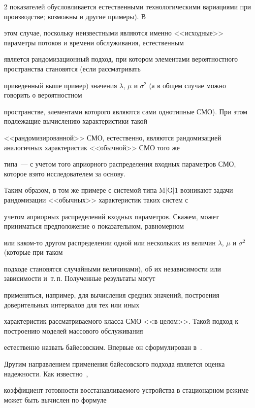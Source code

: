 \begin{multicols}{2}
показателей обусловливается естественными технологическими вариациями при производстве; возможны и другие примеры). В


этом случае, поскольку неизвестными являются именно <<исходные>> параметры потоков и времени обслуживания, естественным


является рандомизационный подход, при котором элементами вероятностного пространства становятся (если рассматривать


приведенный выше пример) значения $\lambda$, $\mu$ и $\sigma^2$ (а в общем случае можно говорить о вероятностном


пространстве, элементами которого являются сами однотипные СМО). При этом подлежащие вычислению характеристики такой


<<рандомизированной>> СМО, естественно, являются рандомизацией аналогичных характеристик <<обычной>> СМО того же


типа~--- с учетом того априорного распределения входных параметров СМО, которое взято исследователем за основу.





Таким образом, в том же примере с системой типа M$\vert$G$\vert$1 возникают задачи рандомизации <<обычных>> характеристик таких систем с


учетом априорных распределений входных па\-ра\-мет\-ров. Скажем, может приниматься предположение о показательном, равномерном


или каком-то другом распределении одной или нескольких из величин $\lambda$, $\mu$ и $\sigma^2$ (которые при таком


подходе становятся случайными величинами), об их независимости или зависимости и~т.\,п. Полученные результаты могут


применяться, например, для вы\-чис\-ле\-ния средних значений, построения доверительных интервалов для тех или иных


характеристик рассматриваемого класса СМО <<в целом>>. Такой подход к построению моделей массового обслуживания


естественно назвать байесовским. Впервые он сформулирован в~\cite{Shorgin05}.





Другим направлением применения байесовского подхода является оценка надежности. Как известно~\cite{Kozlov70},


коэффициент готовности восстанавливаемого устройства в стационарном режиме может быть вычислен по формуле



\end{multicols}
